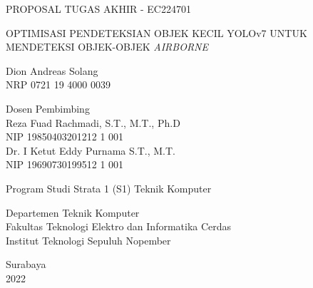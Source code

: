 \begin{large}
  PROPOSAL TUGAS AKHIR - EC224701
\end{large}

\vspace{\fill}

\begin{spacing}{1.5}
  \begin{Large}
    OPTIMISASI PENDETEKSIAN OBJEK KECIL YOLOv7
    UNTUK MENDETEKSI OBJEK-OBJEK \emph{AIRBORNE}
  \end{Large}
\end{spacing}

\vspace{\fill}

\begin{large}
  Dion Andreas Solang \\
  \textnormal{NRP 0721 19 4000 0039}
\end{large}

\vspace{\fill}

\begin{large}
  \textnormal{Dosen Pembimbing} \\
  Reza Fuad Rachmadi, S.T., M.T., Ph.D \\
  \textnormal{NIP 19850403201212 1 001} \\
  Dr. I Ketut Eddy Purnama S.T., M.T. \\
  \textnormal{NIP 19690730199512 1 001}
\end{large}

\vspace{\fill}

Program Studi Strata 1 (S1) Teknik Komputer \\

\normalfont

Departemen Teknik Komputer \\
Fakultas Teknologi Elektro dan Informatika Cerdas \\
Institut Teknologi Sepuluh Nopember

Surabaya \\
2022
